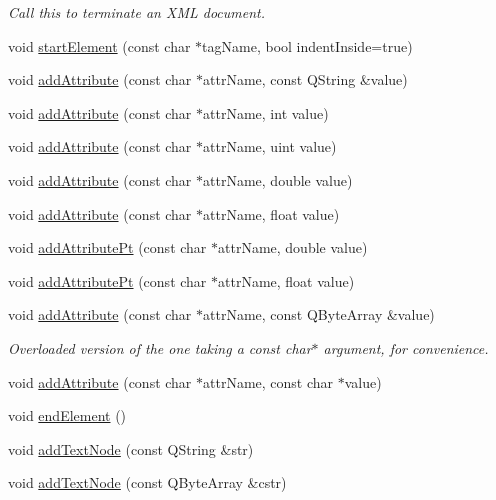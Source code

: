\begin{DoxyCompactItemize}
\begin{DoxyCompactList}\small\item\em Call this to terminate an XML document. \item\end{DoxyCompactList}\item 
void \hyperlink{classKoXmlWriter_a38a32e955d59b3e321914320ec4f2aea}{startElement} (const char $\ast$tagName, bool indentInside=true)
\item 
void \hyperlink{classKoXmlWriter_adbe177678ee94042b4fd352245e625c6}{addAttribute} (const char $\ast$attrName, const QString \&value)
\item 
void \hyperlink{classKoXmlWriter_afa11b5f1fed349624106280436ca7fb5}{addAttribute} (const char $\ast$attrName, int value)
\item 
void \hyperlink{classKoXmlWriter_ae3103a2a23b5a037272ccae9a378d5d2}{addAttribute} (const char $\ast$attrName, uint value)
\item 
void \hyperlink{classKoXmlWriter_a70f154aa14a29bfedc6fc8a8db65274d}{addAttribute} (const char $\ast$attrName, double value)
\item 
void \hyperlink{classKoXmlWriter_af824c78438951baaad9c79cf7c1267a7}{addAttribute} (const char $\ast$attrName, float value)
\item 
void \hyperlink{classKoXmlWriter_a59281d5370c489c60515726e0b38ccd0}{addAttributePt} (const char $\ast$attrName, double value)
\item 
void \hyperlink{classKoXmlWriter_a09a850bdbc2da6652e370508d03c6395}{addAttributePt} (const char $\ast$attrName, float value)
\item 
\hypertarget{classKoXmlWriter_a146659f6c925adc68b2f2b66dccf7ac5}{
void \hyperlink{classKoXmlWriter_a146659f6c925adc68b2f2b66dccf7ac5}{addAttribute} (const char $\ast$attrName, const QByteArray \&value)}
\label{classKoXmlWriter_a146659f6c925adc68b2f2b66dccf7ac5}

\begin{DoxyCompactList}\small\item\em Overloaded version of the one taking a const char$\ast$ argument, for convenience. \item\end{DoxyCompactList}\item 
void \hyperlink{classKoXmlWriter_a920571457da436ac3c6e7f8f0521e48c}{addAttribute} (const char $\ast$attrName, const char $\ast$value)
\item 
void \hyperlink{classKoXmlWriter_ac0c62332ed7c5011e8c8edd9c26019a0}{endElement} ()
\item 
void \hyperlink{classKoXmlWriter_aabee3ed993fcc913c3466083627843fc}{addTextNode} (const QString \&str)
\item 
\hypertarget{classKoXmlWriter_a20e11dad38641d11bd1eac2f520700d3}{
void \hyperlink{classKoXmlWriter_a20e11dad38641d11bd1eac2f520700d3}{addTextNode} (const QByteArray \&cstr)}
\label{classKoXmlWriter_a20e11dad38641d11bd1eac2f520700d3}


\end{DoxyCompactItemize}
